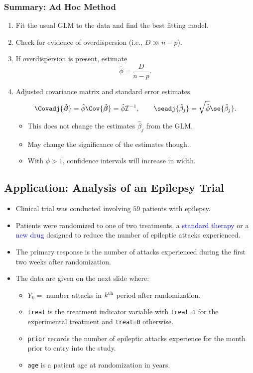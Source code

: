\documentclass[oneside]{book}\usepackage[]{graphicx}\usepackage[svgnames]{xcolor}
\providecommand{\Vector}[1]{\bm{#1}}%
\begin{document}
\subsubsection*{Summary: Ad Hoc Method}
\begin{enumerate}[1.]
    \item Fit the usual GLM to the data and find the best fitting model.
    \item Check for evidence of overdispersion (i.e., $ D\gg n-p $).
    \item If overdispersion is present, estimate
          \[ \hat{\phi}=\frac{D}{n-p}. \]
    \item Adjusted covariance matrix and standard error estimates
          \[ \Covadj{\hat{\Vector{\beta}}}=\hat{\phi}\Cov{\hat{\Vector{\beta}}}=\hat{\phi}\mathcal{I}^{-1},
              \qquad \seadj{\hat{\beta}_j}=\sqrt{\hat{\phi}}\se{\hat{\beta}_j}. \]
          \begin{itemize}
              \item This does not change the estimates $ \hat{\beta}_j $ from the GLM.
              \item May change the significance of the estimates though.
              \item With $ \phi>1 $, confidence intervals will increase in width.
          \end{itemize}
\end{enumerate}
\subsection*{Application: Analysis of an Epilepsy Trial}
\begin{itemize}
    \item Clinical trial was conducted involving $59$ patients with epilepsy.
    \item Patients were randomized to one of two treatments, a \textcolor{Blue}{standard therapy} or a \textcolor{Blue}{new drug}
          designed to reduce the number of epileptic attacks experienced.
    \item The primary response is the number of attacks experienced during the first two
          weeks after randomization.
    \item The data are given on the next slide where:
          \begin{itemize}
              \item $ Y_k= $ number attacks in $ k\textsuperscript{th} $ period after randomization.
              \item \texttt{treat} is the treatment indicator variable with \texttt{treat=1} for the experimental treatment
                    and \texttt{treat=0} otherwise.
              \item \texttt{prior} records the number of epileptic attacks experience for the month prior to entry into the study.
              \item \texttt{age} is a patient age at randomization in years.
          \end{itemize}
\end{itemize}
\end{document}

